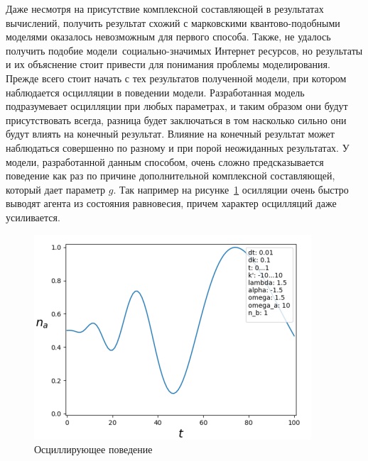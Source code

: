 Даже несмотря на присутствие комплексной составляющей в результатах вычислений, получить результат
схожий с марковскими квантово-подобными моделями оказалось невозможным для первого способа.
Также, не удалось получить подобие модели~социально-значимых Интернет ресурсов, но результаты и их
объяснение стоит привести для понимания проблемы моделирования.
Прежде всего стоит начать с тех результатов полученной модели, при котором наблюдается осцилляции в
поведении модели.
Разработанная модель подразумевает осцилляции при любых параметрах, и таким образом они будут присутствовать
всегда, разница будет заключаться в том насколько сильно они будут влиять на конечный результат.
Влияние на конечный результат может наблюдаться совершенно по разному и при порой неожиданных результатах.
У модели, разработанной данным способом, очень сложно предсказывается поведение как раз по причине
дополнительной комплексной составляющей, который дает параметр $g$.
Так например на рисунке~\ref{fig:fr_oscillation} осилляции очень быстро выводят агента из состояния
равновесия, причем характер осцилляций даже усиливается.
\begin{figure}[h!]
    \centering
    \captionsetup{justification=centering}
    \includegraphics[width=0.65\linewidth]{pictures/result_first_1.png}
    \caption{Осциллирующее поведение}
    \label{fig:fr_oscillation}
\end{figure}

